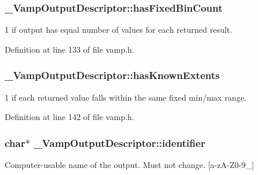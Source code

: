 \subsubsection[{\texorpdfstring{has\+Fixed\+Bin\+Count}{hasFixedBinCount}}]{ \+\_\+\+Vamp\+Output\+Descriptor\+::has\+Fixed\+Bin\+Count}\hypertarget{struct___vamp_output_descriptor_ae8571f5a2bc740738af0cb7dda0c4749}{}\label{struct___vamp_output_descriptor_ae8571f5a2bc740738af0cb7dda0c4749}
1 if output has equal number of values for each returned result. 

Definition at line 133 of file vamp.\+h.

\subsubsection[{\texorpdfstring{has\+Known\+Extents}{hasKnownExtents}}]{ \+\_\+\+Vamp\+Output\+Descriptor\+::has\+Known\+Extents}\hypertarget{struct___vamp_output_descriptor_af6b512d772023b4e852216689c1c4465}{}\label{struct___vamp_output_descriptor_af6b512d772023b4e852216689c1c4465}
1 if each returned value falls within the same fixed min/max range. 

Definition at line 142 of file vamp.\+h.

\subsubsection[{\texorpdfstring{identifier}{identifier}}]{ char$\ast$ \+\_\+\+Vamp\+Output\+Descriptor\+::identifier}\hypertarget{struct___vamp_output_descriptor_a461161b2010370176115967e4f58a5f5}{}\label{struct___vamp_output_descriptor_a461161b2010370176115967e4f58a5f5}
Computer-\/usable name of the output. Must not change. \mbox{[}a-\/z\+A-\/\+Z0-\/9\+\_\+\mbox{]} 

